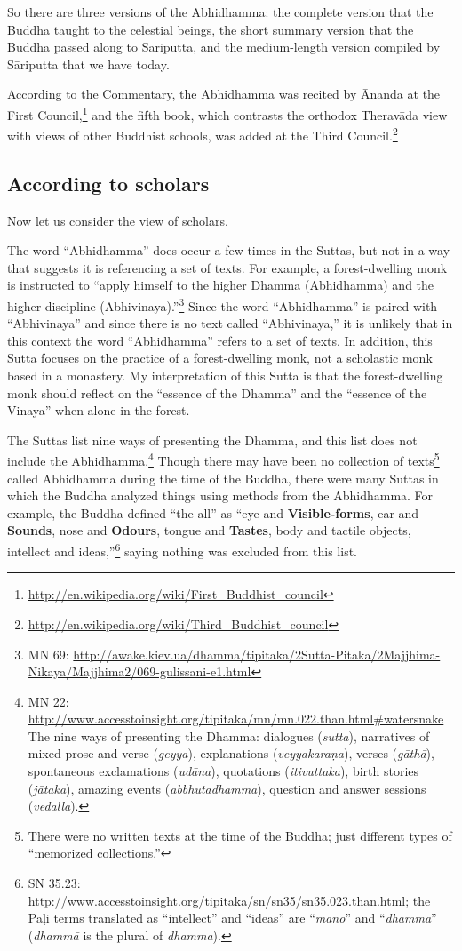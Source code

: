 So there are three versions of the Abhidhamma: the complete version that the Buddha taught to the celestial beings, the short summary version that the Buddha passed along to Sāriputta, and the medium-length version compiled by Sāriputta that we have today. 

According to the Commentary, the Abhidhamma was recited by Ānanda at the First Council,\footnote{\url{http://en.wikipedia.org/wiki/First_Buddhist_council}} and the fifth book, which contrasts the orthodox Theravāda view with views of other Buddhist schools, was added at the Third Council.\footnote{\url{http://en.wikipedia.org/wiki/Third_Buddhist_council}}

\subsection*{According to scholars}

Now let us consider the view of scholars. 

The word “Abhidhamma” does occur a few times in the Suttas, but not in a way that suggests it is referencing a set of texts. For example, a forest-dwelling monk is instructed to “apply himself to the higher Dhamma (Abhidhamma) and the higher discipline (Abhivinaya).”\footnote{MN 69: \url{http://awake.kiev.ua/dhamma/tipitaka/2Sutta-Pitaka/2Majjhima-Nikaya/Majjhima2/069-gulissani-e1.html}} Since the word “Abhidhamma” is paired with “Abhivinaya” and since there is no text called “Abhivinaya,” it is unlikely that in this context the word “Abhidhamma” refers to a set of texts. In addition, this Sutta focuses on the practice of a forest-dwelling monk, not a scholastic monk based in a monastery. My interpretation of this Sutta is that the forest-dwelling monk should reflect on the “essence of the Dhamma” and the “essence of the Vinaya” when alone in the forest.

The Suttas list nine ways of presenting the Dhamma, and this list does not include the Abhidhamma.\footnote{MN 22: \url{http://www.accesstoinsight.org/tipitaka/mn/mn.022.than.html\#watersnake}\\The nine ways of presenting the Dhamma: dialogues (\textit{sutta}), narratives of mixed prose and verse (\textit{geyya}), explanations (\textit{veyyakaraṇa}), verses (\textit{gāthā}), spontaneous exclamations (\textit{udāna}), quotations (\textit{itivuttaka}), birth stories (\textit{jātaka}), amazing events (\textit{abbhutadhamma}), question and answer sessions (\textit{vedalla}).} Though there may have been no collection of texts\footnote{There were no written texts at the time of the Buddha; just different types of “memorized collections.”} called Abhidhamma during the time of the Buddha, there were many Suttas in which the Buddha analyzed things using methods from the Abhidhamma. For example, the Buddha defined “the all” as “eye and \textbf{Visible-forms}, ear and \textbf{Sounds}, nose and \textbf{Odours}, tongue and \textbf{Tastes}, body and tactile objects, intellect and ideas,”\footnote{SN 35.23: \url{http://www.accesstoinsight.org/tipitaka/sn/sn35/sn35.023.than.html}; the Pāḷi terms translated as “intellect” and “ideas” are “\textit{mano}” and “\textit{dhammā}” (\textit{dhammā} is the plural of \textit{dhamma}).} saying nothing was excluded from this list.

